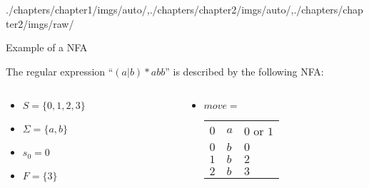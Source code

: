 \begin{graphicspathcontext}{{./chapters/chapter1/imgs/auto/},{./chapters/chapter2/imgs/auto/},{./chapters/chapter2/imgs/raw/}}
\begin{bibunit}[apalike]
\begin{frame}{Example of a NFA}
	\begin{center}
	The regular expression ``$(a|b)*abb$'' is described by the following NFA: \\[.25cm]
	\end{center}
	\begin{columns}
		\begin{column}[t]{.4\linewidth}
			\begin{itemize}
				\item $S = \{0, 1, 2, 3\}$
				\item $\Sigma = \{a, b\}$
				\item $s_0 = 0$
				\item $F = \{3\}$
			\end{itemize}
		\end{column}
		\begin{column}[t]{.6\linewidth}
			\begin{itemize}
				\item $move=$ \begin{tabularx}{.8\linewidth}{|X|X|X|}
					\hline
					\tabularheading\chead{$S$} & \chead{$\Sigma_+$} & \chead{$S'$} \\
					\hline
					$0$ & $a$ & $0$ or $1$\\
					$0$ & $b$ & $0$ \\
					$1$ & $b$ & $2$ \\
					$2$ & $b$ & $3$ \\
					\hline
				\end{tabularx}
			\end{itemize}
		\end{column}
	\end{columns}
\end{frame}


\end{bibunit}
\end{graphicspathcontext}

